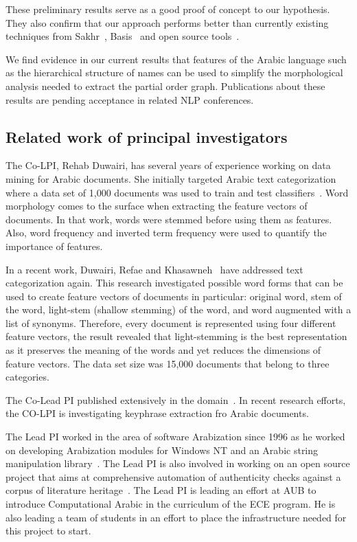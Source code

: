 \documentclass[12pt]{article}
\begin{document}
These preliminary results serve as a good proof of concept to our 
hypothesis. They also confirm that our approach performs better than 
currently existing techniques from Sakhr~\cite{Sak09},
Basis~\cite{Bas09} and open source 
tools~\cite{Col09,Otakar:07,Tim04}.

We find evidence in our current results that features 
of the Arabic language such as the hierarchical structure of
names can be used to simplify the morphological analysis
needed to extract the partial order graph. 
Publications about these results are pending acceptance in 
related NLP conferences. 

\subsection{Related work of principal investigators}

The Co-LPI, Rehab Duwairi, has several years of experience 
working on data mining for Arabic documents. 
She initially targeted Arabic text categorization where a 
data set of 1,000 documents was used to train and test 
classifiers~\cite{Duw06,Duw07}.
Word morphology comes to the surface when extracting the 
feature vectors of documents. 
In that work, words were stemmed before using them as features. 
Also, word frequency and inverted term frequency were used to 
quantify the importance of features. 

In a recent work, Duwairi, Refae and Khasawneh~\cite{Duw09}
have addressed text categorization again. 
This research investigated possible word forms that can be 
used to create feature vectors of documents in particular: 
original word, stem of the word, light-stem (shallow stemming) 
of the word, and word augmented with a list of synonyms. 
Therefore, every document is represented using four different 
feature vectors, the result revealed that light-stemming is the 
best representation as it preserves the meaning of the words 
and yet reduces the dimensions of feature vectors. 
The data set size was 15,000 documents that belong to three 
categories. 

The Co-Lead PI published extensively in the 
domain~\cite{Duw06, Duw07, Duw09}.
In recent research efforts, the CO-LPI is investigating 
keyphrase extraction fro Arabic documents.

The Lead PI worked in the area of software Arabization since 1996 
as he worked on developing Arabization modules for Windows NT 
and an Arabic string manipulation library~\cite{Zar96}. 
The Lead PI is also involved in working on an open source 
project that aims at comprehensive automation of authenticity 
checks against a corpus of literature heritage~\cite{Zar06}.
The Lead PI is leading an effort at AUB to introduce 
Computational Arabic in the curriculum of the ECE program. 
He is also leading a team of students in an effort to place 
the infrastructure needed for this project to start. 
\end{document}
